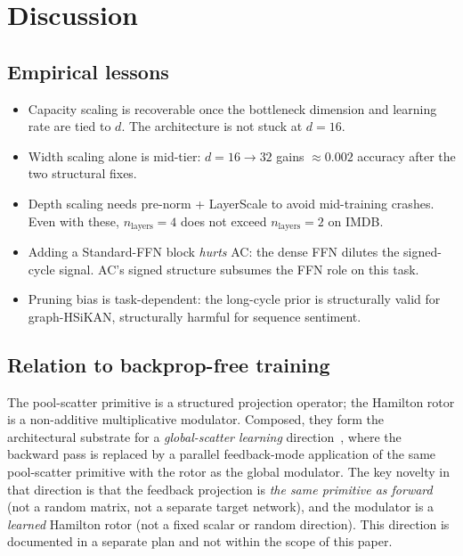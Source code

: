 \documentclass[11pt, a4paper]{article}
\begin{document}
\section{Discussion}
\label{sec:discussion}

\subsection{Empirical lessons}

\begin{itemize}
\item Capacity scaling is recoverable once the bottleneck dimension
      and learning rate are tied to $d$. The architecture is not stuck
      at $d=16$.
\item Width scaling alone is mid-tier: $d=16 \to 32$ gains $\approx 0.002$
      accuracy after the two structural fixes.
\item Depth scaling needs pre-norm + LayerScale to avoid mid-training
      crashes. Even with these, $n_{\text{layers}}=4$ does not exceed
      $n_{\text{layers}}=2$ on IMDB.
\item Adding a Standard-FFN block \emph{hurts} AC: the dense FFN dilutes
      the signed-cycle signal. AC's signed structure subsumes the FFN
      role on this task.
\item Pruning bias is task-dependent: the long-cycle prior is
      structurally valid for graph-HSiKAN, structurally harmful for
      sequence sentiment.
\end{itemize}

\subsection{Relation to backprop-free training}

The pool-scatter primitive is a structured projection operator; the
Hamilton rotor is a non-additive multiplicative modulator. Composed,
they form the architectural substrate for a \emph{global-scatter
learning} direction~\cite{nokland2016direct, lillicrap2016random,
scellier2017equilibrium, whittington2017approximation, hinton2022forward},
where the backward pass is replaced by a parallel feedback-mode
application of the same pool-scatter primitive with the rotor as the
global modulator. The key novelty in that direction is that the
feedback projection is \emph{the same primitive as forward} (not a
random matrix, not a separate target network), and the modulator is a
\emph{learned} Hamilton rotor (not a fixed scalar or random direction).
This direction is documented in a separate plan and not within the
scope of this paper.
\end{document}
